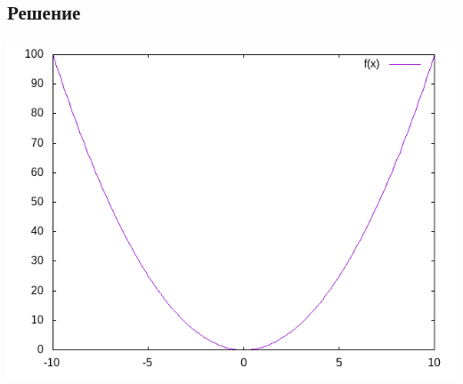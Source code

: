 \documentclass[11pt]{article}
\newcounter{th}\setcounter{th}{0}
\begin{document}
\subsection{Решение}
\label{sec:org3a8088e}
\begin{center}
\includegraphics[width=.9\linewidth]{img/res.png}
\end{center}
\end{document}
